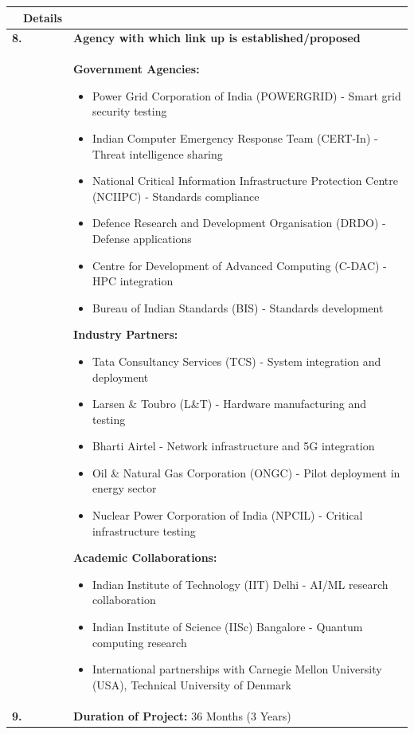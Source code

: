 \documentclass[12pt,a4paper]{article}
\begin{document}
\begin{longtable}{|p{0.5cm}p{3cm}|p{11cm}|}
\hline
\rowcolor{lightblue}
\multicolumn{2}{|c|}{\textbf{Field}} & \textbf{Details} \\
\hline
\endhead

\multicolumn{2}{|l|}{\textbf{8.}} & \textbf{Agency with which link up is established/proposed} \\
\multicolumn{2}{|l|}{} & 
\textbf{Government Agencies:}
\begin{itemize}[leftmargin=1em, itemsep=0pt]
    \item Power Grid Corporation of India (POWERGRID) - Smart grid security testing
    \item Indian Computer Emergency Response Team (CERT-In) - Threat intelligence sharing
    \item National Critical Information Infrastructure Protection Centre (NCIIPC) - Standards compliance
    \item Defence Research and Development Organisation (DRDO) - Defense applications
    \item Centre for Development of Advanced Computing (C-DAC) - HPC integration
    \item Bureau of Indian Standards (BIS) - Standards development
\end{itemize}

\textbf{Industry Partners:}
\begin{itemize}[leftmargin=1em, itemsep=0pt]
    \item Tata Consultancy Services (TCS) - System integration and deployment
    \item Larsen \& Toubro (L\&T) - Hardware manufacturing and testing
    \item Bharti Airtel - Network infrastructure and 5G integration
    \item Oil \& Natural Gas Corporation (ONGC) - Pilot deployment in energy sector
    \item Nuclear Power Corporation of India (NPCIL) - Critical infrastructure testing
\end{itemize}

\textbf{Academic Collaborations:}
\begin{itemize}[leftmargin=1em, itemsep=0pt]
    \item Indian Institute of Technology (IIT) Delhi - AI/ML research collaboration
    \item Indian Institute of Science (IISc) Bangalore - Quantum computing research
    \item International partnerships with Carnegie Mellon University (USA), Technical University of Denmark
\end{itemize} \\
\hline

\multicolumn{2}{|l|}{\textbf{9.}} & \textbf{Duration of Project:} 36 Months (3 Years) \\
\hline

\end{longtable}
\end{document}
